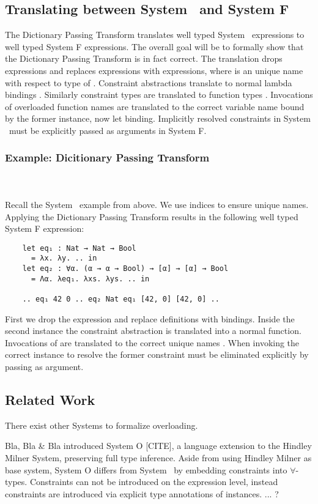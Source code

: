 \subsection{Translating between System \Fo\ and System F}
The Dictionary Passing Transform translates well typed System \Fo\ expressions to well typed System F expressions. 
The overall goal will be to formally show that the Dictionary Passing Transform is in fact correct.
The translation drops  expressions and replaces  expressions with  expressions, where  is an unique name with respect to type  of . 
Constraint abstractions  translate to normal lambda bindings . 
Similarly constraint types  are translated to function types . 
Invocations of overloaded function names are translated to the correct variable name bound by the former instance, now let binding.
Implicitly resolved constraints in System \Fo\ must be explicitly passed as arguments in System F.

\subsubsection{Example: Dicitionary Passing Transform}\hfill\\\\
Recall the System \Fo\ example from above. We use indices to ensure unique names.
Applying the Dictionary Passing Transform results in the following well typed System F expression:
\begin{verbatim}
    let eq₁ : Nat → Nat → Bool 
      = λx. λy. .. in
    let eq₂ : ∀α. (α → α → Bool) → [α] → [α] → Bool 
      = Λα. λeq₁. λxs. λys. .. in
    
    .. eq₁ 42 0 .. eq₂ Nat eq₁ [42, 0] [42, 0] .. 
\end{verbatim}
First we drop the \inl{|\Decl|}expression and replace \inl{|\Inst|}definitions with  bindings. 
Inside the second instance the constraint abstraction is translated into a normal function. 
Invocations of  are translated to the correct unique names .
When invoking  the correct instance to resolve the former constraint must be eliminated explicitly by passing  as argument.

\subsection{Related Work}
There exist other Systems to formalize overloading. 

Bla, Bla \& Bla introduced System O [CITE], a language extension to the Hindley Milner System, preserving full type inference. 
Aside from using Hindley Milner as base system, System O differs from System \Fo\ by embedding constraints into $\forall$-types. 
Constraints can not be introduced on the expression level, instead constraints are introduced via explicit type annotations of instances. 
... ?
